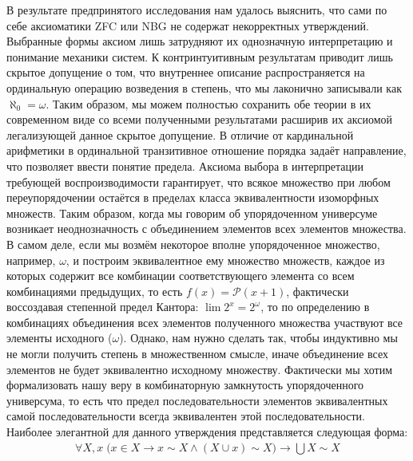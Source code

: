 \documentclass[12pt]{article}
\begin{document}
В результате предпринятого исследования нам удалось выяснить, что сами по себе аксиоматики ZFC или NBG не содержат некорректных утверждений. Выбранные формы аксиом лишь затрудняют их однозначную интерпретацию и понимание механики систем. К контринтуитивным результатам приводит лишь скрытое допущение о том, что внутреннее описание распространяется на ординальную операцию возведения в степень, что мы лаконично записывали как $\aleph_0 = \omega$. Таким образом, мы можем полностью сохранить обе теории в их современном виде со всеми полученными результатами расширив их аксиомой легализующей данное скрытое допущение. В отличие от кардинальной арифметики в ординальной транзитивное отношение порядка задаёт направление, что позволяет ввести понятие предела. Аксиома выбора в интерпретации требующей воспроизводимости гарантирует, что всякое множество при любом переупорядочении остаётся в пределах класса эквивалентности изоморфных множеств. Таким образом, когда мы говорим об упорядоченном универсуме возникает неоднозначность с объединением элементов всех элементов множества. В самом деле, если мы возмём некоторое вполне упорядоченное множество, например, $\omega$, и построим эквивалентное ему множество множеств, каждое из которых содержит все комбинации соответствующего элемента со всем комбинациями предыдущих, то есть $f(x) = \mathcal{P}(x + 1)$, фактически воссоздавая степенной предел Кантора: $\lim 2^x = 2^{\omega}$, то по определению в комбинациях объединения всех элементов полученного множества участвуют все элементы исходного ($\omega$). Однако, нам нужно сделать так, чтобы индуктивно мы не могли получить степень в множественном смысле, иначе объединение всех элементов не будет эквивалентно исходному множеству. Фактически мы хотим формализовать нашу веру в комбинаторную замкнутость упорядоченного универсума, то есть что предел последовательности элементов эквивалентных самой последовательности всегда эквивалентен этой последовательности. Наиболее элегантной для данного утверждения представляется следующая форма:
\begin{equation}
\begin{gathered}
\forall X, x \; \bigl(x \in X \to x \sim X \wedge (X \cup x) \sim X \bigr) \to \bigcup X \sim X
\label{axiom:limitation-axiom}
\end{gathered}
\end{equation}
\end{document}
